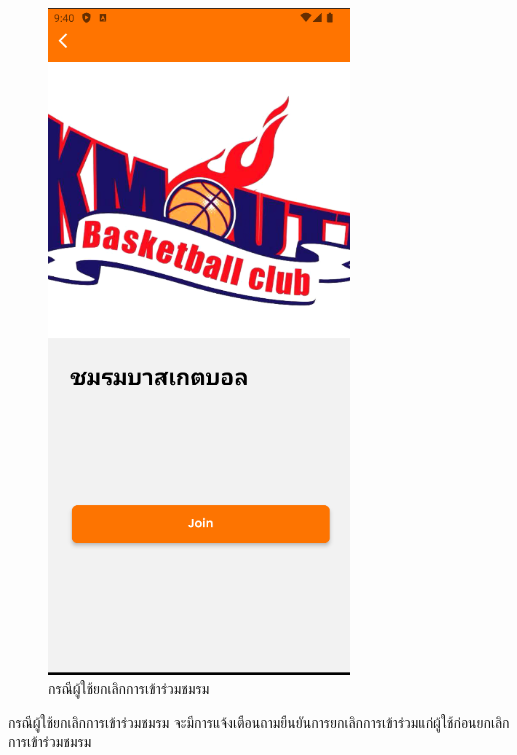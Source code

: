 \documentclass[14pt,oneside,openright,a4paper]{cpe-thai-project}
\begin{document}
\begin{figure}[!h]\centering
  \includegraphics[width=8cm]{./Pictures/Scene9.png}
  \caption{กรณีผู้ใช้ยกเลิกการเข้าร่วมชมรม}\label{fig:CancelJoinClubTest}
\end{figure}
  \hspace*{1cm} กรณีผู้ใช้ยกเลิกการเข้าร่วมชมรม จะมีการแจ้งเตือนถามยืนยันการยกเลิกการเข้าร่วมแก่ผู้ใช้ก่อนยกเลิกการเข้าร่วมชมรม

\newpage
\end{document}

